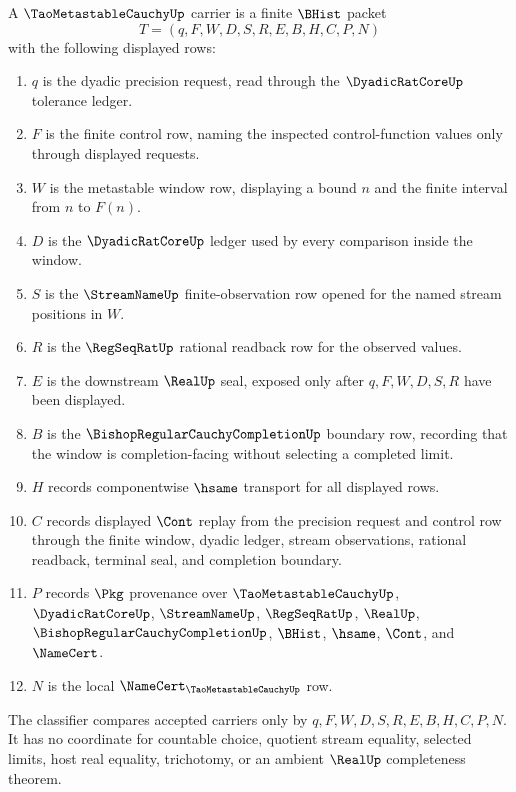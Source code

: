 \begin{definition}\label{def:tao-metastable-cauchy-carrier}
A $\TaoMetastableCauchyUp$ carrier is a finite $\BHist$ packet
$$
T=(q,F,W,D,S,R,E,B,H,C,P,N)
$$
with the following displayed rows:
\begin{enumerate}
\item $q$ is the dyadic precision request, read through the $\DyadicRatCoreUp$ tolerance ledger.
\item $F$ is the finite control row, naming the inspected control-function values only through displayed requests.
\item $W$ is the metastable window row, displaying a bound $n$ and the finite interval from $n$ to $F(n)$.
\item $D$ is the $\DyadicRatCoreUp$ ledger used by every comparison inside the window.
\item $S$ is the $\StreamNameUp$ finite-observation row opened for the named stream positions in $W$.
\item $R$ is the $\RegSeqRatUp$ rational readback row for the observed values.
\item $E$ is the downstream $\RealUp$ seal, exposed only after $q,F,W,D,S,R$ have been displayed.
\item $B$ is the $\BishopRegularCauchyCompletionUp$ boundary row, recording that the window is completion-facing without selecting a completed limit.
\item $H$ records componentwise $\hsame$ transport for all displayed rows.
\item $C$ records displayed $\Cont$ replay from the precision request and control row through the finite window, dyadic ledger, stream observations, rational readback, terminal seal, and completion boundary.
\item $P$ records $\Pkg$ provenance over $\TaoMetastableCauchyUp$, $\DyadicRatCoreUp$, $\StreamNameUp$, $\RegSeqRatUp$, $\RealUp$, $\BishopRegularCauchyCompletionUp$, $\BHist$, $\hsame$, $\Cont$, and $\NameCert$.
\item $N$ is the local $\NameCert_{\TaoMetastableCauchyUp}$ row.
\end{enumerate}
The classifier compares accepted carriers only by $q,F,W,D,S,R,E,B,H,C,P,N$. It has no coordinate for countable choice, quotient stream equality, selected limits, host real equality, trichotomy, or an ambient $\RealUp$ completeness theorem.
\end{definition}

